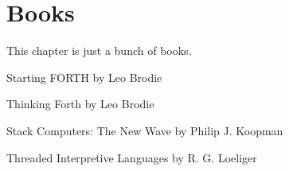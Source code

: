 \setchapterpreamble[u]{\margintoc}
\chapter{Books}

This chapter is just a bunch of books.


Starting FORTH by Leo Brodie \cite{Brodie1981}

Thinking Forth by Leo Brodie \cite{Brodie1984}

Stack Computers: The New Wave by Philip J. Koopman \cite{Koopman1989}

Threaded Interpretive Languages by R. G. Loeliger \cite{Loeliger1981}

